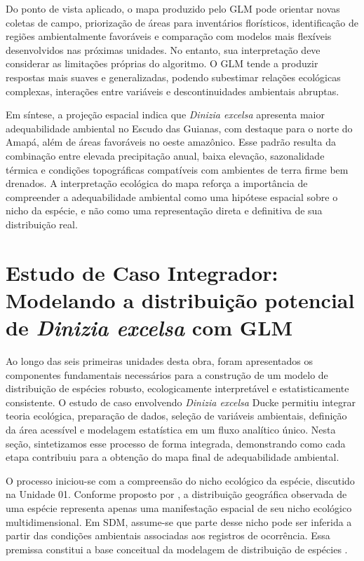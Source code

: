 Do ponto de vista aplicado, o mapa produzido pelo GLM pode orientar novas coletas de campo, priorização de áreas para inventários florísticos, identificação de regiões ambientalmente favoráveis e comparação com modelos mais flexíveis desenvolvidos nas próximas unidades. No entanto, sua interpretação deve considerar as limitações próprias do algoritmo. O GLM tende a produzir respostas mais suaves e generalizadas, podendo subestimar relações ecológicas complexas, interações entre variáveis e descontinuidades ambientais abruptas.

Em síntese, a projeção espacial indica que \textit{Dinizia excelsa} apresenta maior adequabilidade ambiental no Escudo das Guianas, com destaque para o norte do Amapá, além de áreas favoráveis no oeste amazônico. Esse padrão resulta da combinação entre elevada precipitação anual, baixa elevação, sazonalidade térmica e condições topográficas compatíveis com ambientes de terra firme bem drenados. A interpretação ecológica do mapa reforça a importância de compreender a adequabilidade ambiental como uma hipótese espacial sobre o nicho da espécie, e não como uma representação direta e definitiva de sua distribuição real.


\section{Estudo de Caso Integrador: Modelando a distribuição potencial de \textit{Dinizia excelsa} com GLM}

Ao longo das seis primeiras unidades desta obra, foram apresentados os componentes fundamentais necessários para a construção de um modelo de distribuição de espécies robusto, ecologicamente interpretável e estatisticamente consistente. O estudo de caso envolvendo \textit{Dinizia excelsa} Ducke permitiu integrar teoria ecológica, preparação de dados, seleção de variáveis ambientais, definição da área acessível e modelagem estatística em um fluxo analítico único. Nesta seção, sintetizamos esse processo de forma integrada, demonstrando como cada etapa contribuiu para a obtenção do mapa final de adequabilidade ambiental.

O processo iniciou-se com a compreensão do nicho ecológico da espécie, discutido na Unidade 01. Conforme proposto por \citet{hutchinson1957concluding}, a distribuição geográfica observada de uma espécie representa apenas uma manifestação espacial de seu nicho ecológico multidimensional. Em SDM, assume-se que parte desse nicho pode ser inferida a partir das condições ambientais associadas aos registros de ocorrência. Essa premissa constitui a base conceitual da modelagem de distribuição de espécies \citep{peterson2011ecological,elith2009species}.

